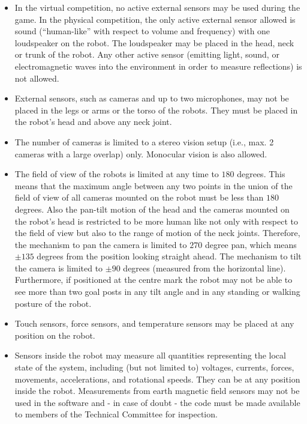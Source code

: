 \begin{itemize}
\item In the virtual competition, no active external sensors may be used during the game. In the physical competition, the only active external sensor allowed is sound
(``human-like'' with respect to volume and frequency) with one loudspeaker on the robot. The loudspeaker may be placed in the head, neck or trunk of the robot. Any
other active sensor (emitting light, sound, or electromagnetic waves into the environment in order to measure reflections) is not allowed.
\item External sensors, such as cameras and up to two microphones, may not be placed in the legs or arms or the
torso of the robots. They must be placed in the robot's
head and above any neck joint. 
\item The number of cameras is limited to a stereo vision setup (i.e., max. 2 cameras with a large overlap) only. Monocular vision is also allowed.
\item The field of view of the robots is limited at any time to $180$ degrees. This means that the maximum angle between any two points in the union of the field of view of all cameras mounted on the robot must be less than $180$ degrees. Also the pan-tilt motion of the head and the cameras mounted on the robot's head is restricted to be more human like not only with respect to the field of view but also to the range of motion of the neck joints. Therefore, the mechanism to pan the camera is limited to $270$ degree pan, which means $\pm135$ degrees from the position looking straight ahead. The mechanism to tilt the camera is limited to $\pm90$ degrees (measured from the horizontal line). Furthermore, if positioned at the centre mark the robot may not be able to see more than two goal posts in any tilt angle and in any standing or walking posture of the robot. 
\item Touch sensors, force sensors, and temperature sensors may be placed at any position on the robot.
\item Sensors inside the robot may measure all quantities representing the local state of the system, including (but not limited to) voltages, currents, forces, movements, accelerations, and rotational speeds. They can be at any position inside the robot. Measurements from earth magnetic field sensors may not be used in the software and - in case of doubt - the code must be made available to members of the Technical Committee for inspection.
\end{itemize}

